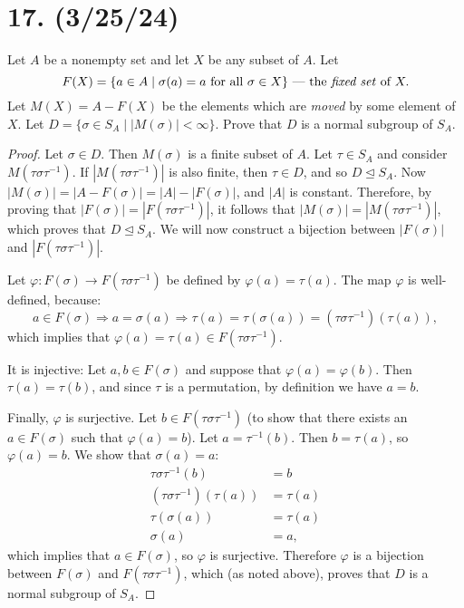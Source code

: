 \documentclass{article}
\begin{document}
\section*{17. (3/25/24)}

Let $A$ be a nonempty set and let $X$ be any subset of $A$. Let
\begin{equation*}
    F(X) = \{ a \in A \mid \sigma(a) = a \text{ for all } \sigma \in X \} \text{ — the \emph{fixed set} of } X.
\end{equation*}
Let $M(X) = A - F(X)$ be the elements which are \emph{moved} by some element of $X$. Let $D = \{ \sigma \in S_A \mid |M(\sigma)| < \infty \}$. Prove that $D$ is a normal subgroup of $S_A$.

\begin{proof}
    Let $\sigma \in D$. Then $M(\sigma)$ is a finite subset of $A$. Let $\tau \in S_A$ and consider $M(\tau \sigma \tau^{-1})$. If $|M(\tau \sigma \tau^{-1})|$ is also finite, then $\tau \in D$, and so $D \unlhd S_A$. Now $|M(\sigma)| = |A - F(\sigma)| = |A| - |F(\sigma)|$, and $|A|$ is constant. Therefore, by proving that $|F(\sigma)| = |F(\tau \sigma \tau^{-1})|$, it follows that $|M(\sigma)| = |M(\tau \sigma \tau^{-1})|$, which proves that $D \unlhd S_A$. We will now construct a bijection between $|F(\sigma)|$ and $|F(\tau \sigma \tau^{-1})|$.
    
    Let $\varphi: F(\sigma) \rightarrow F(\tau \sigma \tau^{-1})$ be defined by $\varphi(a) = \tau(a)$. The map $\varphi$ is well-defined, because:
    \begin{equation*}
        a \in F(\sigma) \Rightarrow a = \sigma(a) \Rightarrow \tau(a) = \tau(\sigma(a)) = (\tau \sigma \tau^{-1}) (\tau(a)),
    \end{equation*}
    which implies that $\varphi(a) = \tau(a) \in F(\tau \sigma \tau^{-1})$.

    It is injective: Let $a, b \in F(\sigma)$ and suppose that $\varphi(a) = \varphi(b)$. Then $\tau(a) = \tau(b)$, and since $\tau$ is a permutation, by definition we have $a = b$.
    
    Finally, $\varphi$ is surjective. Let $b \in F(\tau \sigma \tau^{-1})$ (to show that there exists an $a \in F(\sigma)$ such that $\varphi(a) = b$). Let $a = \tau^{-1}(b)$. Then $b = \tau(a)$, so $\varphi(a) = b$. We show that $\sigma(a) = a$:
    \begin{align*}
        \tau \sigma \tau^{-1}(b) &= b \\
        (\tau \sigma \tau^{-1})(\tau(a)) &= \tau(a) \\
        \tau (\sigma(a)) &= \tau(a) \\
        \sigma(a) &= a,
    \end{align*}
    which implies that $a \in F(\sigma)$, so $\varphi$ is surjective. Therefore $\varphi$ is a bijection between $F(\sigma)$ and $F(\tau \sigma \tau^{-1})$, which (as noted above), proves that $D$ is a normal subgroup of $S_A$.
\end{proof}
\end{document}
